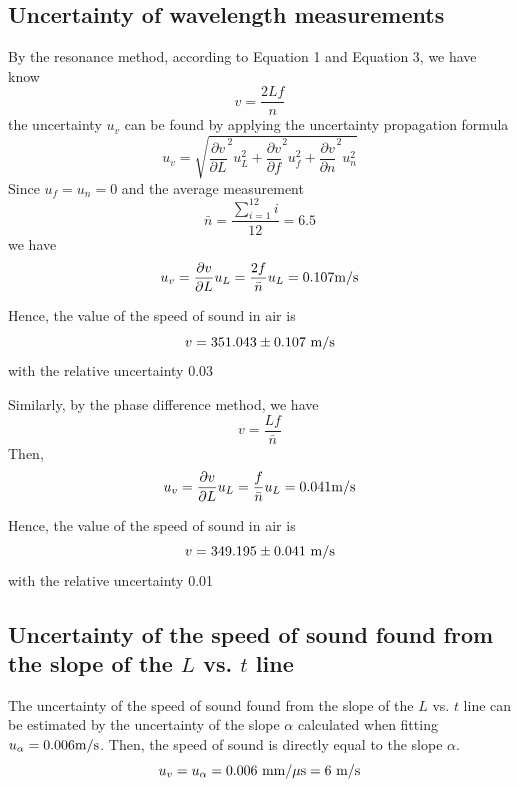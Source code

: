 \documentclass[a4paper]{report}
\begin{document}
	\subsection{Uncertainty of wavelength measurements}
	By the resonance method, according to Equation 1 and Equation 3, we have know
	\begin{equation*}
	v=\dfrac{2Lf}{n}
	\end{equation*}
	the uncertainty $u_v$ can be found by applying the uncertainty propagation formula
	\begin{equation*}
	u_v=\sqrt{\dfrac{\partial v}{\partial L}^2 u_L^2+\dfrac{\partial v}{\partial f}^2 u_f^2+\dfrac{\partial v}{\partial n}^2 u_n^2}
	\end{equation*}
	Since $u_f=u_n=0$ and the average measurement
	\begin{equation*}
	\bar{n}=\dfrac{\sum_{i=1}^{12}i}{12}=6.5
	\end{equation*}
	we have
	\begin{equation*}
	u_v=\dfrac{\partial v}{\partial L} u_L=\dfrac{2f}{\bar{n}} u_L=0.107 \rm{m/s}
	\end{equation*}
	
	Hence, the value of the speed of sound in air is
	\begin{equation*}
	v=351.043\pm0.107\ \rm{m/s}
	\end{equation*}
	with the relative uncertainty 0.03%
	
	Similarly, by the phase difference method, we have
	\begin{equation*}
	v=\dfrac{Lf}{\bar{n}}
	\end{equation*}
	Then,
	\begin{equation*}
	u_v=\dfrac{\partial v}{\partial L} u_L=\dfrac{f}{\bar{n}} u_L=0.041 \rm{m/s}
	\end{equation*}
	
	Hence, the value of the speed of sound in air is
	\begin{equation*}
	v=349.195\pm0.041\ \rm{m/s}
	\end{equation*}
	with the relative uncertainty 0.01%
	\subsection{Uncertainty of the speed of sound found from the slope of the $L$ vs. $t$ line}
	The uncertainty of the speed of sound found from the slope of the $L$ vs. $t$ line can be estimated by the uncertainty of the slope $\alpha$ calculated when fitting $u_\alpha=0.006 \rm{m/s}$. Then, the speed of sound is directly equal to the slope $\alpha$.
	\begin{equation*}
	u_v=u_\alpha=0.006\ \rm{mm/\mu s}=6\ \rm{m/s}
	\end{equation*}
	
\end{document}
